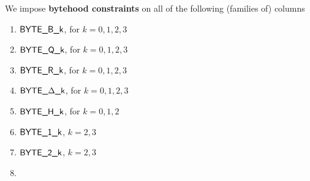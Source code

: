We impose \textbf{bytehood constraints} on all of the following (families of) columns
\begin{multicols}{2}
\begin{enumerate}
	\item $\textsf{BYTE}\textsf{\_B\_k}$, for $k=0,1,2,3$
	\item $\textsf{BYTE}\textsf{\_Q\_k}$, for $k=0,1,2,3$
	\item $\textsf{BYTE}\textsf{\_R\_k}$, for $k=0,1,2,3$
	\item $\textsf{BYTE}\textsf{\_$\Delta$\_k}$, for $k=0,1,2,3$
	\item $\textsf{BYTE}\textsf{\_H\_k}$, for $k=0,1,2$
	\item $\textsf{BYTE}\textsf{\_1\_k}$, $k = 2, 3$
	\item $\textsf{BYTE}\textsf{\_2\_k}$, $k = 2, 3$
	\item[\vspace{\fill}]
\end{enumerate}
\end{multicols}

